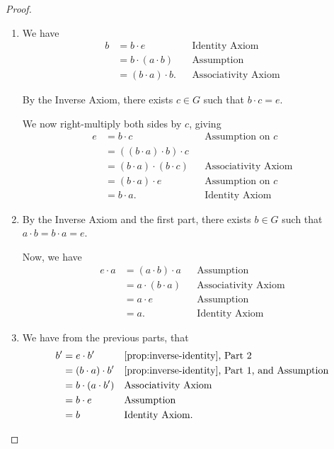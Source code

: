 \documentclass{article}
\theoremstyle{definition}
\theoremstyle{remark}
\newcommand{\pqty}[1]{\left(#1\right)}
\begin{document}
\begin{proof}
    \begin{enumerate}
        \item We have
        \begin{align*}
            b &= b \cdot e && \text{Identity Axiom} \\
            &= b \cdot \pqty{a \cdot b} && \text{Assumption} \\
            &= \pqty{b \cdot a} \cdot b. && \text{Associativity Axiom}
        \end{align*}

        By the Inverse Axiom, there exists \(c \in G\) such that \(b \cdot c = e\).

        We now right-multiply both sides by \(c\), giving
        \begin{align*}
            e &= b \cdot c && \text{Assumption on }c \\
            &= \pqty{\pqty{b \cdot a} \cdot b} \cdot c \\
            &= \pqty{b \cdot a} \cdot \pqty{b \cdot c} && \text{Associativity Axiom} \\
            &= \pqty{b \cdot a} \cdot e && \text{Assumption on }c \\
            &= b \cdot a. && \text{Identity Axiom}
        \end{align*}

        \item By the Inverse Axiom and the first part, there exists \(b \in G\) such that \(a \cdot b = b \cdot a = e\).
        
        Now, we have
        \begin{align*}
            e \cdot a &= \pqty{a \cdot b} \cdot a && \text{Assumption} \\
            &= a \cdot \pqty{b \cdot a} && \text{Associativity Axiom} \\
            &= a \cdot e && \text{Assumption} \\
            &= a. && \text{Identity Axiom}
        \end{align*}

        \item We have from the previous parts, that
        \begin{align*}
            b' &= e \cdot b' && \text{\autoref{prop:inverse-identity}, Part 2} \\
            &= \pqty{b \cdot a} \cdot b' && \text{\autoref{prop:inverse-identity}, Part 1, and Assumption} \\
            &= b \cdot \pqty{a \cdot b'} && \text{Associativity Axiom} \\
            &= b \cdot e && \text{Assumption} \\
            &= b && \text{Identity Axiom}.
        \end{align*}


\end{enumerate}
\end{proof}
\end{document}
